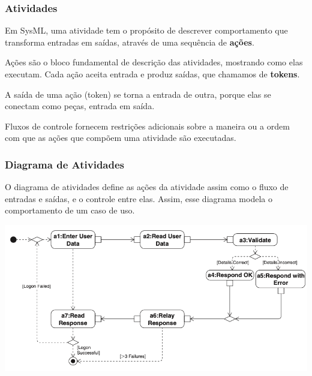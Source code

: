 \subsubsection{Atividades}
Em SysML, uma atividade tem o propósito de descrever comportamento que transforma entradas em saídas, através de uma sequência de \textbf{ações}.

Ações são o bloco fundamental de descrição das atividades, mostrando como elas executam. Cada ação aceita entrada e produz saídas, que chamamos de \textbf{tokens}.

A saída de uma ação (token) se torna a entrada de outra, porque elas se conectam como peças, entrada em saída.

Fluxos de controle fornecem restrições adicionais sobre a maneira ou a ordem com que as ações que compõem uma atividade são executadas.

\subsubsection{Diagrama de Atividades}

O diagrama de atividades define as ações da atividade assim como o fluxo de entradas e saídas, e o controle entre elas. Assim, esse diagrama modela o comportamento de um caso de uso.

\includegraphics[width=\textwidth,height=\textheight,keepaspectratio]{figures/diagrama-atividades-1.png}